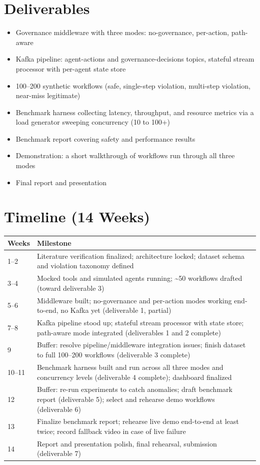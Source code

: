 \documentclass[12pt]{article}
\begin{document}
\section{Deliverables}
\begin{itemize}
    \item Governance middleware with three modes: no-governance, per-action, path-aware
    \item Kafka pipeline: agent-actions and governance-decisions topics, stateful stream processor with per-agent state store
    \item 100--200 synthetic workflows (safe, single-step violation, multi-step violation, near-miss legitimate)
    \item Benchmark harness collecting latency, throughput, and resource metrics via a load generator sweeping concurrency (10 to 100+)
    \item Benchmark report covering safety and performance results
    \item Demonstration: a short walkthrough of workflows run through all three modes
    \item Final report and presentation
\end{itemize}

\section{Timeline (14 Weeks)}
\begin{center}
\begin{tabular}{@{}p{}p{}@{}}
\toprule
\textbf{Weeks} & \textbf{Milestone} \\
\midrule
1--2 & Literature verification finalized; architecture locked; dataset schema and violation taxonomy defined \\
3--4 & Mocked tools and simulated agents running; \textasciitilde50 workflows drafted (toward deliverable 3) \\
5--6 & Middleware built; no-governance and per-action modes working end-to-end, no Kafka yet (deliverable 1, partial) \\
7--8 & Kafka pipeline stood up; stateful stream processor with state store; path-aware mode integrated (deliverables 1 and 2 complete) \\
9 & Buffer: resolve pipeline/middleware integration issues; finish dataset to full 100--200 workflows (deliverable 3 complete) \\
10--11 & Benchmark harness built and run across all three modes and concurrency levels (deliverable 4 complete); dashboard finalized \\
12 & Buffer: re-run experiments to catch anomalies; draft benchmark report (deliverable 5); select and rehearse demo workflows (deliverable 6) \\
13 & Finalize benchmark report; rehearse live demo end-to-end at least twice; record fallback video in case of live failure \\
14 & Report and presentation polish, final rehearsal, submission (deliverable 7) \\
\bottomrule
\end{tabular}
\end{center}
\end{document}
